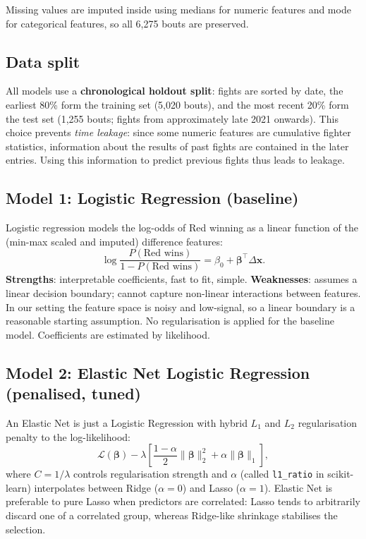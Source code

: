 \documentclass{article}
\begin{document}
Missing values are imputed inside using medians
for numeric features and mode for categorical features, so all 6{,}275 bouts
are preserved.

\subsection{Data split}

All models use a \textbf{chronological holdout split}: fights are sorted by
date, the earliest 80\% form the training set (5{,}020 bouts), and the most
recent 20\% form the test set (1{,}255 bouts; fights from approximately
late 2021 onwards).
This choice prevents \emph{time leakage}: since some numeric features are
cumulative fighter statistics, information about the results of past fights
are contained in the later entries. Using this information to predict
previous fights thus leads to leakage.

\subsection{Model 1: Logistic Regression (baseline)}

Logistic regression models the log-odds of Red winning as a linear function
of the (min-max scaled and imputed) difference features:
\[
  \log \frac{P(\text{Red wins})}{1 - P(\text{Red wins})} = \beta_0 + \boldsymbol{\beta}^\top \Delta\mathbf{x}.
\]
\textbf{Strengths}: interpretable coefficients, fast to fit, simple.
\textbf{Weaknesses}: assumes a linear decision boundary; cannot capture
non-linear interactions between features.
In our setting the feature space is noisy and low-signal, so a linear boundary
is a reasonable starting assumption.
No regularisation is applied for the baseline model. Coefficients are estimated
by likelihood.

\subsection{Model 2: Elastic Net Logistic Regression (penalised, tuned)}

An Elastic Net is just a Logistic Regression 
with hybrid $L_1$ and $L_2$ regularisation penalty to the log-likelihood:
\[
  \mathcal{L}(\boldsymbol{\beta}) - \lambda \left[
    \frac{1-\alpha}{2}\|\boldsymbol{\beta}\|_2^2
    + \alpha \|\boldsymbol{\beta}\|_1
  \right],
\]
where $C = 1/\lambda$ controls regularisation strength and $\alpha$
(called \texttt{l1\_ratio} in scikit-learn) interpolates between Ridge
($\alpha=0$) and Lasso ($\alpha=1$).
Elastic Net is preferable to pure Lasso when predictors are correlated:
Lasso tends to arbitrarily discard one of a correlated group, whereas
Ridge-like shrinkage stabilises the selection.
\end{document}
